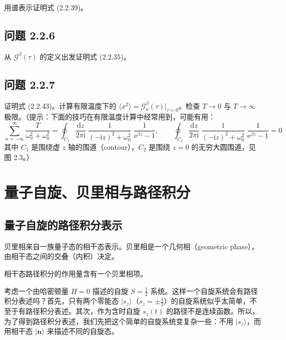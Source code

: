 用谱表示证明式 (2.2.39)。

\subsection*{问题 2.2.6}

从 $\mathcal{G}^{\beta}(\tau)$ 的定义出发证明式 (2.2.35)。

\subsection*{问题 2.2.7}

证明式 (2.2.43)。计算有限温度下的 $\langle x^2\rangle = \mathcal{G}^{\beta}_{x}(\tau)\bigr|_{\tau = 0}$。检查 $T \to 0$ 与 $T \to \infty$ 极限。（提示：下面的技巧在有限温度计算中经常用到，可能有用：
\begin{equation*}
\sum_{n = -\infty}^{\infty} \frac{T}{\omega_n^2 + \omega_0^2} = \oint_{C_1} \frac{\mathrm{d}z}{2\pi\mathrm{i}}\; \frac{1}{(-\mathrm{i}z)^2 + \omega_0^2}\; \frac{1}{\mathrm{e}^{\beta z} - 1}, \qquad \oint_{C_2} \frac{\mathrm{d}z}{2\pi\mathrm{i}}\; \frac{1}{(-\mathrm{i}z)^2 + \omega_0^2}\; \frac{1}{\mathrm{e}^{\beta z} - 1} = 0
\end{equation*}
其中 $C_1$ 是围绕虚 $z$ 轴的围道（contour），$C_2$ 是围绕 $z = 0$ 的无穷大圆围道，见图 2.3。）

\section{量子自旋、贝里相与路径积分}

\subsection{量子自旋的路径积分表示}

\begin{keypoints}
\item 贝里相来自一族量子态的相干态表示。贝里相是一个几何相（geometric phase），由相干态之间的交叠（内积）决定。
\item 相干态路径积分的作用量含有一个贝里相项。
\end{keypoints}

考虑一个由哈密顿量 $H = 0$ 描述的自旋 $S = \frac{1}{2}$ 系统。这样一个自旋系统会有路径积分表述吗？首先，只有两个零能态 $|s_z\rangle$（$s_z = \pm\frac{1}{2}$）的自旋系统似乎太简单，不至于有路径积分表述。其次，作为含时自旋 $s_z(t)$ 的路径不是连续函数。所以，为了得到路径积分表述，我们先把这个简单的自旋系统变复杂一些：不用 $|s_z\rangle$，而用相干态 $|\pmb{n}\rangle$ 来描述不同的自旋态。


